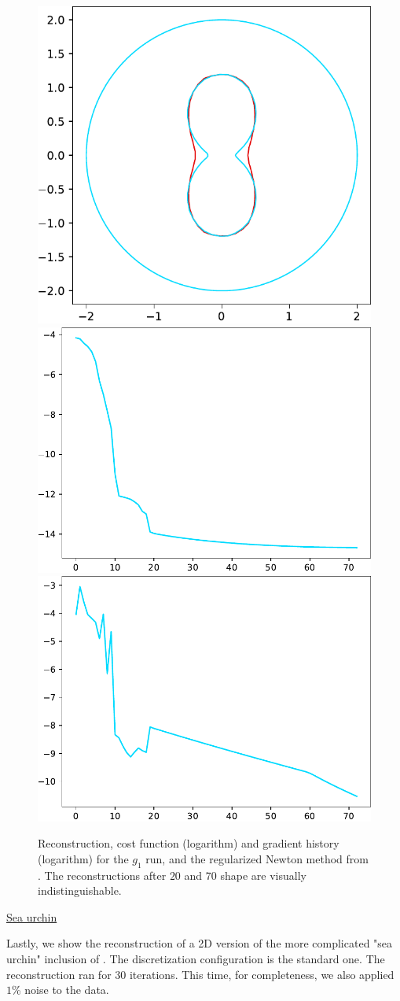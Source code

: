 \documentclass[english,a4paper,9pt,oneside]{scrbook}	%
\theoremstyle{break}
\theoremstyle{remark}
\begin{document}
\begin{figure}[H]
\centering
\includegraphics[height=0.25\columnwidth]{Images/hourglass_constant_newton/comparison.pdf}
\includegraphics[height=0.25\columnwidth]{Images/hourglass_constant_newton/cost_function.pdf}
\includegraphics[height=0.25\columnwidth]{Images/hourglass_constant_newton/gradient_infty_norm.pdf}
\caption{Reconstruction, cost function (logarithm) and gradient history (logarithm) for the $g_1$ run, and the regularized Newton method from \cite{eppler}. The reconstructions after $20$ and $70$ shape are visually indistinguishable.}\label{fig:newton}
\end{figure}

\underline{Sea urchin}

Lastly, we show the reconstruction of a 2D version of the more complicated "sea urchin" inclusion of \cite{harbrecht}. The discretization configuration is the standard one. The reconstruction ran for $30$ iterations. This time, for completeness, we also applied $1$\% noise to the data.
\end{document}
